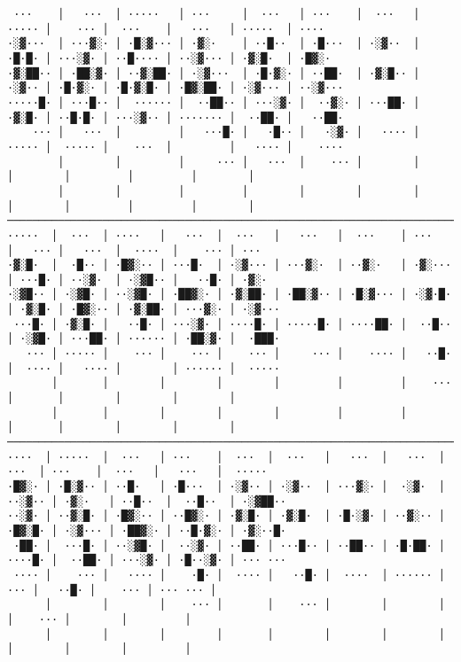 \documentclass[a4paper,10pt,ngerman]{scrartcl}
\begin{document}
\begin{lstlisting}
 ···    │   ···  │ ·····   │ ···     │  ···   │ ···    │  ···   │ ····· │    ··· │  ···    │   ···   │ ·····  │ ····
·░▓···  │ ···▓░· │ ·█░▓··· │ ·▓░·    │ ··█··  │ ·█···  │ ·░▓··  │ ·█·█· │ ···░▓· │ ··█···· │ ··░▓··· │ ·▓░█·  │ ·█▓░·
·▓░██·· │ ·██░▓· │ ··▓░██· │ ·░▓···  │ ·█·▓░· │ ··██·  │ ·▓░█·· │ ·░▓·· │ ·█·▓░· │ ·█·▓░█· │ ·█▓░██· │ ·░▓··· │ ··░▓···
·····█· │ ···█·· │  ······ │  ··██·· │ ···░▓· │  ··▓░· │ ···██· │ ·▓░█· │ ··█·█· │ ···░▓·· │ ······· │  ··██· │   ··██·
    ··· │   ···  │         │   ···█· │   ·█·· │   ·░▓· │   ···· │ ····· │  ····· │    ···  │         │   ···· │    ····
        │        │         │     ··· │   ···  │    ··· │        │       │        │         │         │        │
        │        │         │         │        │        │        │       │        │         │         │        │
───────────────────────────────────────────────────────────────────────────────────────────────────────────────────────
·····  │  ···  │ ····   │   ···  │  ···   │   ···   │  ···    │ ···    │   ··· │   ···  │  ····  │    ··· │ ···
·▓░█·  │  ·█·· │ ·█▓░·· │ ···█·  │ ·░▓··· │ ···▓░·  │ ··▓░·   │ ·▓░··· │ ···█· │ ··░▓·  │ ·░▓█·· │   ··█· │ ·▓░·
·░▓█·· │ ·░▓█· │ ··░▓█· │ ·██▓░· │ ·▓░██· │ ·██░▓·· │ ·█░▓··· │ ·░▓·█· │ ·▓░█· │ ·█▓░·· │ ·▓░██· │ ···▓░· │ ·░▓···
 ···█· │ ·▓░█· │   ··█· │ ···░▓· │ ····█· │ ·····█· │ ····██· │  ··█·· │ ·░▓█· │ ···██· │ ······ │ ·██░▓· │  ·███·
   ··· │ ····· │    ··· │    ··· │    ··· │     ··· │    ···· │   ··█· │  ···· │   ···· │        │ ······ │  ·····
       │       │        │        │        │         │         │    ··· │       │        │        │        │
       │       │        │        │        │         │         │        │       │        │        │        │
──────────────────────────────────────────────────────────────────────────────────────────────────────────────────
····  │ ·····  │  ···   │ ···    │  ···  │  ···   │   ···  │   ···  │   ···  │ ···    │  ···   │   ···   │  ·····
·█▓░· │ ·█░▓·· │ ··█·   │ ·█···  │ ·░▓·· │ ·░▓··  │ ···▓░· │  ·░▓·  │ ··░▓·· │ ·▓░·   │ ··█··  │  ··█··  │ ·░▓██··
··░▓· │ ··▓░█· │ ·█▓░·· │ ··█▓░· │ ·▓░█· │ ·▓░█·  │ ·█·░▓· │ ··▓░·· │ ·█▓░█· │ ·░▓··· │ ·██▓░· │ ··█·▓░· │ ·▓░··█·
 ·██· │  ···█· │ ··░▓█· │  ··░▓· │ ··██· │ ···█·· │ ··██·· │ ·█·██· │ ····█· │  ··██· │ ···░▓· │ ·█··░▓· │ ··· ···
 ···· │    ··· │   ···· │    ·█· │  ···· │   ··█· │  ····  │ ······ │    ··· │   ··█· │    ··· │ ··· ··· │
      │        │        │    ··· │       │    ··· │        │        │        │    ··· │        │         │
      │        │        │        │       │        │        │        │        │        │        │         │

\end{lstlisting}
\end{document}
